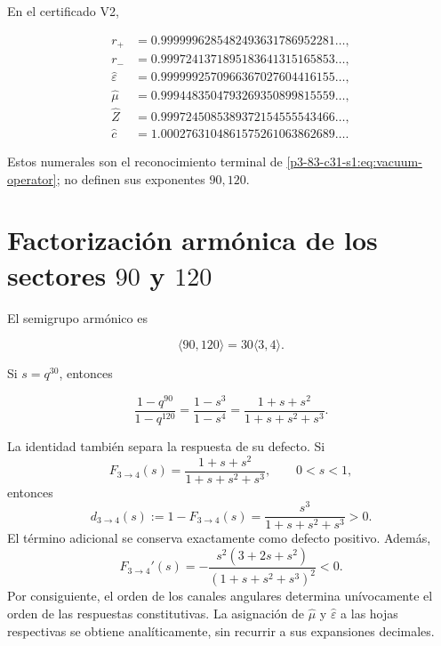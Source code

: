 En el certificado V2,

\begin{align*}
r_+&=0.9999996285482493631786952281\ldots,\\
r_-&=0.9997241371895183641315165853\ldots,\\
\widehat\varepsilon&=0.9999992570966367027604416155\ldots,\\
\widehat\mu&=0.9994483504793269350899815559\ldots,\\
\widehat Z&=0.9997245085389372154555543466\ldots,\\
\widehat c&=1.0002763104861575261063862689\ldots.
\end{align*}

Estos numerales son el reconocimiento terminal de \cref{p3-83-c31-s1:eq:vacuum-operator}; no definen sus exponentes \(90,120\).

\section{Factorizaci\'on arm\'onica de los sectores \texorpdfstring{\(90\)}{90} y \texorpdfstring{\(120\)}{120}}

El semigrupo arm\'onico es

\[
\langle90,120\rangle=30\langle3,4\rangle.
\]

Si \(s=q^{30}\), entonces

\begin{equation}
\frac{1-q^{90}}{1-q^{120}}
=\frac{1-s^3}{1-s^4}
=\frac{1+s+s^2}{1+s+s^2+s^3}.
\label{p3-83-c31-s1:eq:three-four-completion}
\end{equation}

La identidad tambi\'en separa la respuesta de su defecto. Si
\[
F_{3\to4}(s)=\frac{1+s+s^2}{1+s+s^2+s^3},
\qquad 0<s<1,
\]
entonces
\begin{equation}
d_{3\to4}(s):=1-F_{3\to4}(s)
=\frac{s^3}{1+s+s^2+s^3}>0.
\label{p3-83-c31-s1:eq:vacuum-defect34}
\end{equation}
El t\'ermino adicional se conserva exactamente como defecto
positivo. Adem\'as,
\begin{equation}
F_{3\to4}'(s)
=-\frac{s^2(3+2s+s^2)}{(1+s+s^2+s^3)^2}<0.
\label{p3-83-c31-s1:eq:vacuum-monotonic34}
\end{equation}
Por consiguiente, el orden de los canales angulares determina un\'ivocamente
el orden de las respuestas constitutivas. La asignaci\'on de
\(\widehat\mu\) y \(\widehat\varepsilon\) a las hojas respectivas se obtiene
anal\'iticamente, sin recurrir a sus expansiones decimales.

